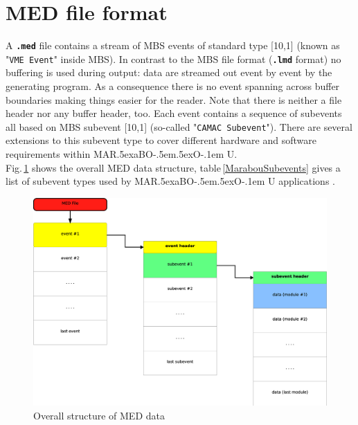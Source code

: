 \documentclass[10pt,a4paper]{article}
\def\MARaBOU{MAR\lower.5ex\hbox{a}BO\kern-.5em\lower.5ex\hbox{O}\kern-.1em U}%
\begin{document}
\section{MED file format}
A \texttt{\textbf{.med}} file contains a stream of MBS events of standard type [10,1]
(known as "\texttt{VME Event}" inside MBS).
In contrast to the MBS file format (\texttt{\textbf{.lmd}} format) no buffering is used during output:
data are streamed out event by event by the generating program.
As a consequence there is no event spanning across buffer boundaries making things easier for the reader.
Note that there is neither a file header nor any buffer header, too.
Each event contains a sequence of subevents all based on MBS subevent [10,1] (so-called "\texttt{CAMAC Subevent}").
There are several extensions to this subevent type to cover different hardware and software requirements within \MARaBOU{}.\\
Fig.\,\ref{MedFileFormat} shows the overall MED data structure,
table\,\ref{MarabouSubevents} gives a list of subevent types used by \MARaBOU{} applications \cite{MarabouHomePage}.
\begin{figure}[H]
\centerline{\includegraphics[width=\linewidth]{MedFileStructure}}
\caption{Overall structure of MED data}
\label{MedFileFormat}
\end{figure} 
\end{document}
